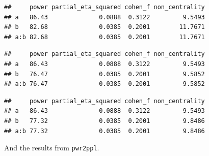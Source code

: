 \documentclass[]{book}
\newenvironment{Shaded}{\begin{snugshade}}{\end{snugshade}}
\newcommand{\DataTypeTok}[1]{\textcolor[rgb]{0.13,0.29,0.53}{#1}}
\newcommand{\KeywordTok}[1]{\textcolor[rgb]{0.13,0.29,0.53}{\textbf{#1}}}
\newcommand{\NormalTok}[1]{#1}
\newcommand{\OperatorTok}[1]{\textcolor[rgb]{0.81,0.36,0.00}{\textbf{#1}}}
\newcommand{\OtherTok}[1]{\textcolor[rgb]{0.56,0.35,0.01}{#1}}
\newcommand{\StringTok}[1]{\textcolor[rgb]{0.31,0.60,0.02}{#1}}
\begin{document}
\begin{verbatim}
##     power partial_eta_squared cohen_f non_centrality
## a   86.43              0.0888  0.3122         9.5493
## b   82.68              0.0385  0.2001        11.7671
## a:b 82.68              0.0385  0.2001        11.7671
\end{verbatim}

\begin{Shaded}
\end{Shaded}

\begin{verbatim}
##     power partial_eta_squared cohen_f non_centrality
## a   86.43              0.0888  0.3122         9.5493
## b   76.47              0.0385  0.2001         9.5852
## a:b 76.47              0.0385  0.2001         9.5852
\end{verbatim}

\begin{Shaded}
\end{Shaded}

\begin{verbatim}
##     power partial_eta_squared cohen_f non_centrality
## a   86.43              0.0888  0.3122         9.5493
## b   77.32              0.0385  0.2001         9.8486
## a:b 77.32              0.0385  0.2001         9.8486
\end{verbatim}

And the results from \texttt{pwr2ppl}.
\end{document}
